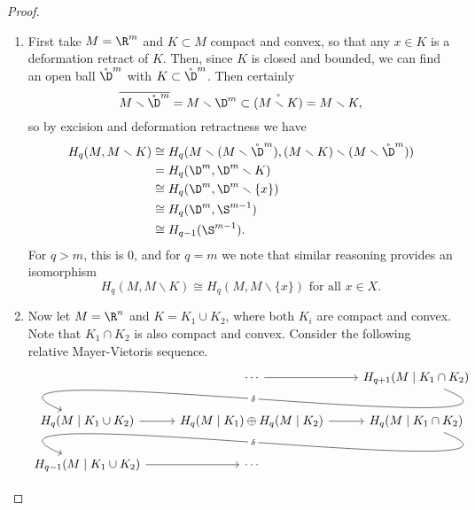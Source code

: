 \documentclass[main.tex]{subfiles}
\begin{document}
\begin{proof}
  \leavevmode
  \begin{enumerate}
    \item First take \(M = \R^{m}\) and \(K \subset M\) compact and convex, so that any \(x \in K\) is a deformation retract of \(K\). Then, since \(K\) is closed and bounded, we can find an open ball \(\mathring{\D}^{m}\) with \(K \subset \mathring{\D}^{m}\). Then certainly
      \begin{equation*}
        \overline{M \smallsetminus \mathring{\D}^{m}} = M \smallsetminus \D^{m} \subset \mathring{(M \smallsetminus K)} = M \smallsetminus K,
      \end{equation*}
      so by excision and deformation retractness we have
      \begin{align*}
        H_{q}(M, M \smallsetminus K) &\cong H_{q}(M \smallsetminus (M \smallsetminus \mathring{\D}^{m}), (M \smallsetminus K) \smallsetminus (M \smallsetminus \mathring{\D}^{m})) \\
        &= H_{q}(\D^{m}, \D^{m} \smallsetminus K) \\
        &\cong H_{q}(\D^{m}, \D^{m} \smallsetminus \{x\}) \\
        &\cong H_{q}(\D^{m}, \S^{m-1}) \\
        &\cong H_{q-1}(\S^{m-1}).
      \end{align*}
      For \(q > m\), this is \(0\), and for \(q = m\) we note that similar reasoning provides an isomorphism
      \begin{equation*}
        H_{q}(M, M \smallsetminus K) \cong H_{q}(M, M \smallsetminus \{x\})\text{ for all } x \in X.
      \end{equation*}

    \item Now let \(M = \R^{n}\) and \(K = K_{1} \cup K_{2}\), where both \(K_{i}\) are compact and convex. Note that \(K_{1} \cap K_{2}\) is also compact and convex. Consider the following relative Mayer-Vietoris sequence.
      \begin{equation*}
        \begin{tikzcd}
          & \cdots
          \arrow[r]
          & H_{q+1}(M\mid K_{1} \cap K_{2})
          \\
          H_{q}(M\mid K_{1} \cup K_{2})
          \arrow[from=urr, out=-22, in=157, looseness=1, overlay, "\delta" description]
          \arrow[r]
          & H_{q}(M\mid K_{1}) \oplus H_{q}(M\mid K_{2})
          \arrow[r]
          & H_{q}(M\mid K_{1} \cap K_{2})
          \\
          H_{q-1}(M\mid K_{1} \cup K_{2})
          \arrow[r]
          \arrow[from=urr, out=-22, in=157, looseness=1, overlay, "\delta" description]
          & \cdots
        \end{tikzcd}
      \end{equation*}


\end{enumerate}
\end{proof}
\end{document}
